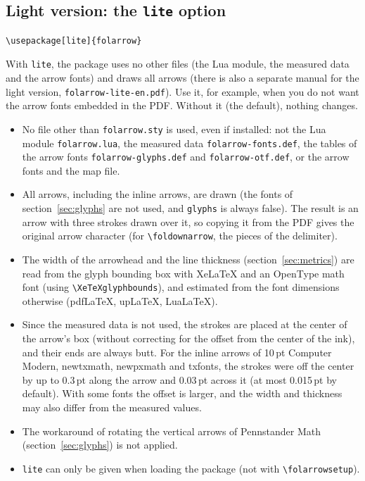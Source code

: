 \documentclass[dvipdfmx,a4paper]{article}
\newcommand\pkg[1]{\textsf{#1}}
\newcommand\file[1]{\texttt{#1}}
\begin{document}
\subsection{Light version: the \texttt{lite} option}\label{sec:lite}
\begin{Verbatim}
\usepackage[lite]{folarrow}
\end{Verbatim}
With \verb|lite|, the package uses no other files (the Lua module, the measured data and the
arrow fonts) and draws all arrows (there is also a separate manual for the light version,
\file{folarrow-lite-en.pdf}). Use it, for example, when you do not want the arrow fonts
embedded in the PDF. Without it (the default), nothing changes.
\begin{itemize}
\item No file other than \file{folarrow.sty} is used, even if installed: not the Lua module
  \file{folarrow.lua}, the measured data \file{folarrow-fonts.def}, the tables of the arrow fonts
  \file{folarrow-glyphs.def} and \file{folarrow-otf.def}, or the arrow fonts and the map file.
\item All arrows, including the inline arrows, are drawn (the fonts of section~\ref{sec:glyphs}
  are not used, and \verb|glyphs| is always false). The result is an arrow with three strokes
  drawn over it, so copying it from the PDF gives the original arrow character (for
  \verb|\foldownarrow|, the pieces of the delimiter).
\item The width of the arrowhead and the line thickness (section~\ref{sec:metrics}) are read
  from the glyph bounding box with Xe\LaTeX{} and an OpenType math font (using
  \verb|\XeTeXglyphbounds|), and estimated from the font dimensions otherwise
  (pdf\LaTeX, up\LaTeX, Lua\LaTeX).
\item Since the measured data is not used, the strokes are placed at the center of the arrow's
  box (without correcting for the offset from the center of the ink), and their ends are always
  butt. For the inline arrows of 10\,pt Computer Modern, \pkg{newtxmath}, \pkg{newpxmath} and
  \pkg{txfonts}, the strokes were off the center by up to 0.3\,pt along the arrow and 0.03\,pt
  across it (at most 0.015\,pt by default). With some fonts the offset is larger, and the width
  and thickness may also differ from the measured values.
\item The workaround of rotating the vertical arrows of Pennstander Math
  (section~\ref{sec:glyphs}) is not applied.
\item \verb|lite| can only be given when loading the package (not with \verb|\folarrowsetup|).
\end{itemize}
\end{document}
